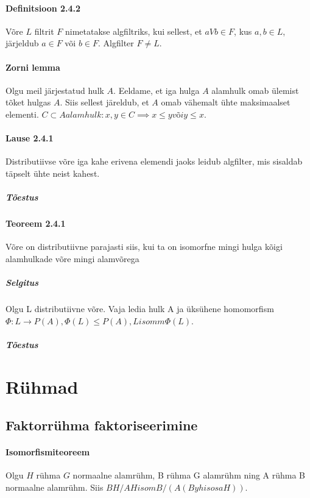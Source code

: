 \documentclass[12pt]{article}
\begin{document}
\paragraph{Definitsioon 2.4.2}
Võre $L$ filtrit $F$ nimetatakse algfiltriks, kui sellest, et $a V b \in F$, kus $a,b \in L$, järjeldub
$a \in F$ või $b \in F$. Algfilter $F \neq L$. 

\paragraph{Zorni lemma}
Olgu meil järjestatud hulk $A$. Eeldame, et iga hulga $A$ alamhulk omab ülemist tõket hulgas $A$. Siis sellest järeldub, et $A$ omab vähemalt ühte maksimaalset elementi. $C \subset A alamhulk: x,y \in C \implies x \leq y või y \leq x$.

\paragraph{Lause 2.4.1}
Distributiivse võre iga kahe erivena elemendi jaoks leidub algfilter, mis sisaldab täpselt ühte neist kahest. 

\subparagraph{Tõestus}


\paragraph{Teoreem 2.4.1}
Võre on distributiivne parajasti siis, kui ta on isomorfne mingi hulga kõigi alamhulkade võre mingi alamvõrega

\subparagraph{Selgitus}
Olgu L distributiivne võre. Vaja ledia hulk A ja \"uks\"uhene homomorfism $\Phi : L \rightarrow P(A), \Phi(L) \leq P(A), L isomm \Phi(L)$. 

\subparagraph{Tõestus}

\section{R\"uhmad}

\subsection{Faktorr\"uhma faktoriseerimine}

\paragraph{Isomorfismiteoreem}
Olgu $H$ rühma $G$ normaalne alamr\"uhm, B r\"uhma G alamr\"uhm ning A r\"uhma B normaalne alamr\"uhm. Siis $BH/AH isom B/(A(B yhisosa H))$.
\end{document}
